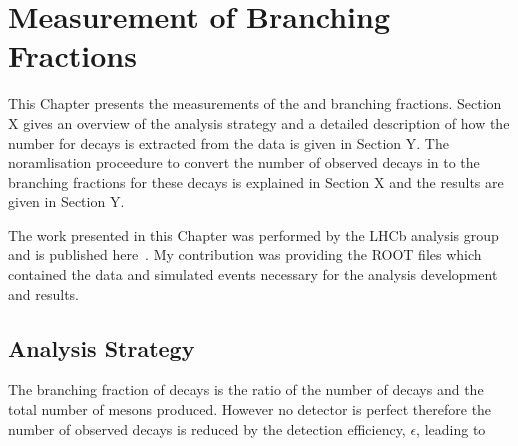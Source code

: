 \chapter{Measurement of \bmumu Branching Fractions}
\label{sec:BFanalysis}
This Chapter presents the measurements of the \bdmumu and \bsmumu branching fractions. Section X gives an overview of the analysis strategy and a detailed description of how the number for \bmumu decays is extracted from the data is given in Section Y. The noramlisation proceedure to convert the number of observed \bmumu decays in to the branching fractions for these decays is explained in Section X and the results are given in Section Y. 

The work presented in this Chapter was performed by the \bmumu LHCb analysis group and is published here~\cite{}. My contribution was providing the ROOT files which contained the data and simulated events necessary for the analysis development and results.

\section{Analysis Strategy} 
\label{sec:BFAnalysisStrategy}

The branching fraction of \bmumu decays is the ratio of the number of \bmumu decays and the total number of \bsd mesons produced. However no detector is perfect therefore the number of observed \bmumu decays is reduced by the detection efficiency, $\epsilon$, leading to

